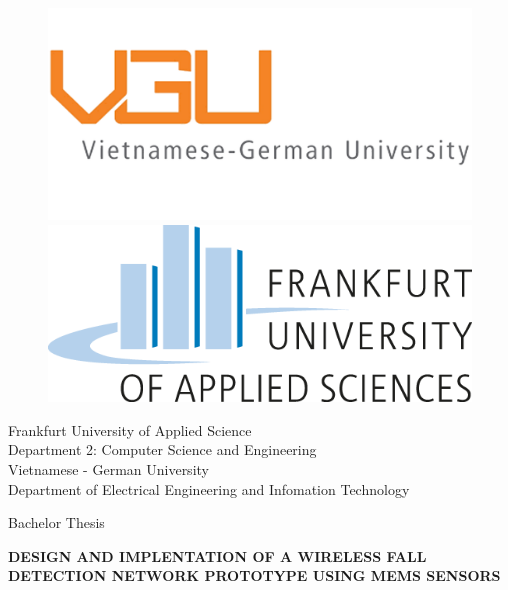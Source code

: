 \pagestyle{empty}

\begin{titlepage}
		\begin{figure}
			\begin{minipage}[c]{0.4\linewidth}
			\includegraphics[scale=0.3]{VGU}
			\end{minipage}
			\hfil
				\begin{minipage}[c]{0.2\linewidth}
				\includegraphics[scale=0.25]{FRAUAS}
			\end{minipage}	
		\end{figure}
     
        \begin{center}
        \normalsize
        	Frankfurt University of Applied Science\\
        	Department 2: Computer Science and Engineering\\
        	\vspace*{0.1cm}
        	Vietnamese - German University\\
        	Department of Electrical Engineering and Infomation Technology
        \vspace*{1cm}	
        \begin{center}
        	Bachelor Thesis
        \end{center}
        \vspace*{1.3cm}
        \Large
        {\bf DESIGN AND IMPLENTATION OF A WIRELESS FALL DETECTION NETWORK PROTOTYPE USING MEMS SENSORS}


\end{center}
\end{titlepage}

